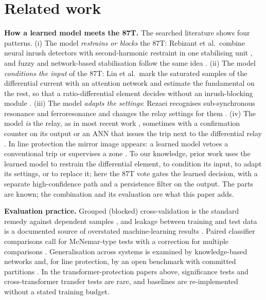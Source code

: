 \documentclass[preprint,12pt]{elsarticle}
\begin{document}
\section{Related work}
\label{sec:related}
\textbf{How a learned model meets the 87T.} The searched literature shows four patterns. (i) The model \emph{restrains or blocks} the 87T: Rebizant et al.\ combine neural inrush detectors with second-harmonic restraint in one stabilising unit \citep{rebizant2007}, and fuzzy and network-based stabilisation follow the same idea \citep{bejmert2014}. (ii) The model \emph{conditions the input} of the 87T: Lin et al.\ mark the saturated samples of the differential current with an attention network and estimate the fundamental on the rest, so that a ratio-differential element decides without an inrush-blocking module \citep{lin2023}. (iii) The model \emph{adapts the settings}: Rezaei recognises sub-synchronous resonance and ferroresonance and changes the relay settings for them \citep{rezaei2026}. (iv) The model \emph{is} the relay, as in most recent work \citep{afrasiabi2020,afrasiabi2022,murugan2022,afsharisefat2023,afsharisefat2024,alhamd2024,key2025,wang2025}, sometimes with a confirmation counter on its output \citep{shi2026} or an ANN that issues the trip next to the differential relay \citep{bhatt2016}. In line protection the mirror image appears: a learned model vetoes a conventional trip \citep{khaw2019} or supervises a zone \citep{sahoo2021}. To our knowledge, prior work uses the learned model to restrain the differential element, to condition its input, to adapt its settings, or to replace it; here the 87T vote gates the learned decision, with a separate high-confidence path and a persistence filter on the output. The parts are known; the combination and its evaluation are what this paper adds.

\textbf{Evaluation practice.} Grouped (blocked) cross-validation is the standard remedy against dependent samples \citep{roberts2017}, and leakage between training and test data is a documented source of overstated machine-learning results \citep{kapoor2023,matania2024}. Paired classifier comparisons call for McNemar-type tests \citep{mcnemar1947,dietterich1998,demsar2006} with a correction for multiple comparisons \citep{holm1979}%
. Generalisation across systems is examined by knowledge-based networks \citep{li2020} and, for line protection, by an open benchmark with committed partitions \citep{oelhaf2026}. In the transformer-protection papers above, significance tests and cross-transformer transfer tests are rare, and baselines are re-implemented without a stated training budget.
\end{document}
